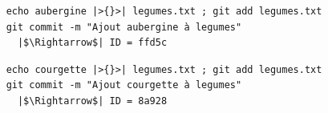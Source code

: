 \documentclass[table,tikz,12pt,svgnames]{beamer}
\begin{document}
\begin{frame}[fragile]
	\pause[4]
	\begin{verbatim}
	echo aubergine |>{}>| legumes.txt ; git add legumes.txt
	git commit -m "Ajout aubergine à legumes"
	  |$\Rightarrow$| ID = ffd5c
	\end{verbatim}
	\pause[6]
	\begin{verbatim}
	echo courgette |>{}>| legumes.txt ; git add legumes.txt
	git commit -m "Ajout courgette à legumes"
	  |$\Rightarrow$| ID = 8a928
	\end{verbatim}
\end{frame}
\end{document}
